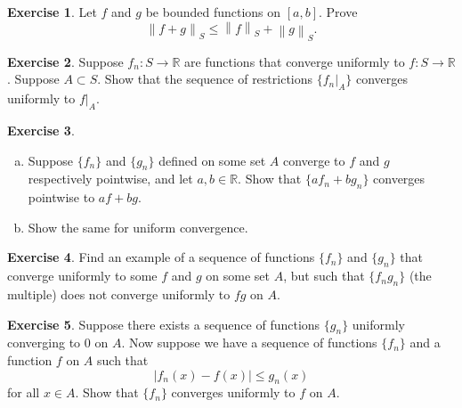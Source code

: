 \documentclass[12pt,openany]{book}
\newcommand{\abs}[1]{\left\lvert {#1} \right\rvert}
\newcommand{\norm}[1]{\left\lVert {#1} \right\rVert}
\newcommand{\R}{{\mathbb{R}}}
\theoremstyle{plain}
\theoremstyle{remark}
\theoremstyle{definition}
\newenvironment{exbox}{%
    \def\FrameCommand{\vrule width 1pt \relax\hspace{10pt}}%
    \MakeFramed{\advance\hsize-\width\FrameRestore}%
}{%
    \endMakeFramed
}
\newenvironment{exparts}{%
    \leavevmode\begin{enumerate}[a),noitemsep,topsep=0pt,parsep=0pt,partopsep=0pt]
}{%
    \end{enumerate}
}
\theoremstyle{exercise}
\newtheorem{exercise}{Exercise}[section]
\theoremstyle{example}
\begin{document}
\begin{exbox}
\begin{exercise}
Let $f$ and $g$ be bounded functions on $[a,b]$.  Prove 
\begin{equation*}
\norm{f+g}_S \leq \norm{f}_S + \norm{g}_S .
\end{equation*}
\end{exercise}


\begin{exercise}
Suppose $f_n \colon S \to \R$ are functions that converge uniformly
to $f \colon S \to \R$.  Suppose $A \subset S$.  Show that
the sequence of restrictions $\{ f_n|_A \}$ converges uniformly to $f|_A$.
\end{exercise}

\begin{exercise}
\begin{exparts}
\item
Suppose $\{ f_n \}$ and $\{ g_n \}$ defined on some set $A$ converge to
$f$ and $g$ respectively pointwise, and let $a,b \in \R$.
Show that $\{ a f_n+ b g_n \}$ converges
pointwise to $a f+ b g$.
\item
Show the same for uniform convergence.
\end{exparts}
\end{exercise}

\begin{exercise}
Find an example of a sequence of functions $\{ f_n \}$ and $\{ g_n \}$
that converge uniformly to some $f$ and $g$ on some set $A$, but such that
$\{ f_ng_n \}$ (the multiple) does not converge uniformly to $fg$ on $A$.
\end{exercise}

\begin{exercise}
Suppose there exists a sequence of functions $\{ g_n \}$ uniformly
converging to $0$ on $A$.  Now suppose we have a sequence of functions
$\{ f_n \}$ and a function $f$ on $A$ such that
\begin{equation*}
\abs{f_n(x) - f(x)} \leq g_n(x) 
\end{equation*}
for all $x \in A$.  Show that $\{ f_n \}$ converges uniformly to $f$ on $A$.
\end{exercise}


\end{exbox}
\end{document}
